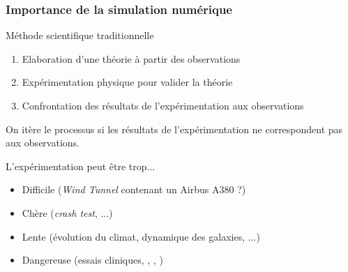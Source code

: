 \documentclass[xcolor={x11names,svgnames}]{beamer}
\begin{document}
\begin{frame}
\frametitle{Importance de la simulation numérique}

\begin{block}{Méthode scientifique traditionnelle}
  \begin{enumerate}
  \item Elaboration d'une théorie à partir des observations  
  \item Expérimentation physique pour valider la théorie
  \item Confrontation des résultats de l'expérimentation aux observations 
  \end{enumerate}
\end{block}

On itère le processus si les résultats de l'expérimentation ne correspondent pas
aux observations.

\begin{alertblock}{L'expérimentation peut être trop...}
  \begin{itemize}
  \item Difficile (\emph{Wind Tunnel} contenant un Airbus A380 ?)
  \item Chère (\emph{crash test}, ...)
  \item Lente (évolution du climat, dynamique des galaxies, ...)
  \item Dangereuse (essais cliniques, \Biohazard, \Radioactivity, \Laserbeam)
  \end{itemize}
\end{alertblock}
\end{frame}

\end{document}
